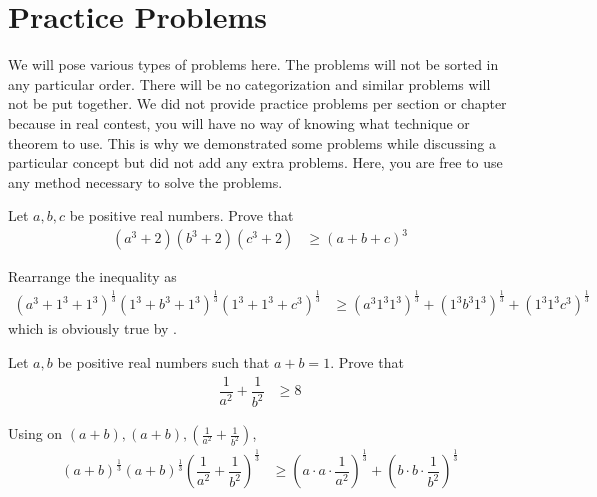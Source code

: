 \documentclass[inequalities.tex]{subfile}
\begin{document}
	\chapter{Practice Problems}\label{ch:practice}

	We will pose various types of problems here. The problems will not be sorted in any particular order. There will be no categorization and similar problems will not be put together. We did not provide practice problems per section or chapter because in real contest, you will have no way of knowing what technique or theorem to use. This is why we demonstrated some problems while discussing a particular concept but did not add any extra problems. Here, you are free to use any method necessary to solve the problems.
		\begin{problem}
			Let $a,b,c$ be positive real numbers. Prove that
				\begin{align*}
					(a^{3}+2)(b^{3}+2)(c^{3}+2)
						& \geq (a+b+c)^{3}
				\end{align*}

				\begin{solution}
					Rearrange the inequality as
						\begin{align*}
							(a^{3}+1^{3}+1^{3})^{\frac{1}{3}}(1^{3}+b^{3}+1^{3})^{\frac{1}{3}}(1^{3}+1^{3}+c^{3})^{\frac{1}{3}}
								& \geq \left(a^{3}1^{3}1^{3}\right)^{\frac{1}{3}}+\left(1^{3}b^{3}1^{3}\right)^{\frac{1}{3}}+\left(1^{3}1^{3}c^{3}\right)^{\frac{1}{3}}
						\end{align*}
					which is obviously true by .
				\end{solution}
		\end{problem}

		\begin{problem}
			Let $a,b$ be positive real numbers such that $a+b=1$. Prove that
				\begin{align*}
					\dfrac{1}{a^{2}}+\dfrac{1}{b^{2}}
						& \geq 8
				\end{align*}

				\begin{solution}
					Using  on $(a+b),(a+b),\left(\frac{1}{a^{2}}+\frac{1}{b^{2}}\right)$,
						\begin{align*}
							(a+b)^{\frac{1}{3}}(a+b)^{\frac{1}{3}}\left(\dfrac{1}{a^{2}}+\dfrac{1}{b^{2}}\right)^{\frac{1}{3}}
								& \geq \left(a\cdot a\cdot\dfrac{1}{a^{2}}\right)^{\frac{1}{3}}+\left(b\cdot b\cdot\dfrac{1}{b^{2}}\right)^{\frac{1}{3}}
						\end{align*}
				\end{solution}
		\end{problem}
\end{document}

